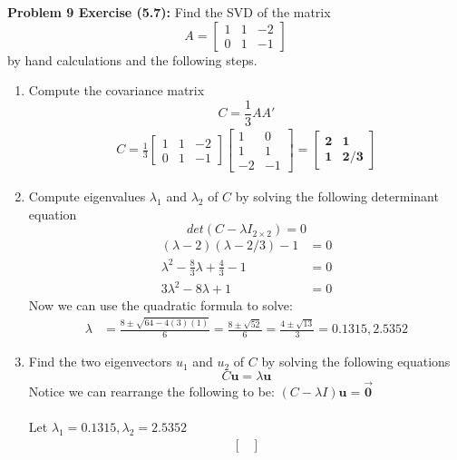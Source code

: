 \documentclass[11pt]{article}
\newenvironment{problem}[1]{\textbf{Problem #1: }}{\newpage}
\begin{document}
	\begin{problem}{9 Exercise (5.7)}
		Find the SVD of the matrix
		\[A = \begin{bmatrix}
			1 & 1 & -2 \\
			0 & 1 & -1
		\end{bmatrix}\]
		by hand calculations and the following steps.
		\begin{enumerate}[label = (\alph*)]
			\item Compute the covariance matrix
			\[C = \frac{1}{3}AA'\]
			\begin{align*}
				C = \frac{1}{3}\begin{bmatrix}
					1 & 1 & -2 \\
					0 & 1 & -1
				\end{bmatrix}\begin{bmatrix}
					1 & 0 \\
					1 & 1 \\
					-2 & -1 
				\end{bmatrix} = \boldsymbol{\begin{bmatrix}
					2 & 1 \\
					1 & 2/3	
				\end{bmatrix}}
			\end{align*}
			\item Compute eigenvalues $\lambda_1$ and $\lambda_2$ of $C$ by solving the following determinant equation
			\[det(C - \lambda I_{2 \times 2}) = 0\] 
			\begin{align*}
				(\lambda - 2)(\lambda - 2/3 ) - 1 &= 0 \\
				\lambda^2 - \frac{8}{3}\lambda + \frac{4}{3} - 1 &= 0 \\
				3\lambda^2 - 8\lambda + 1 &= 0
			\end{align*}
			Now we can use the quadratic formula to solve:
			\begin{align*}
				\lambda &= \frac{8 \pm \sqrt{64 - 4(3)(1)}}{6} = \frac{8 \pm \sqrt{52}}{6} = \frac{4 \pm \sqrt{13}}{3} = \boldsymbol{0.1315, 2.5352}
			\end{align*}
			\item Find the two eigenvectors $u_1$ and $u_2$ of $C$ by solving the following equations
			\[C\boldsymbol{u} = \lambda\boldsymbol{u}\]
			Notice we can rearrange the following to be:
			$(C - \lambda I)\boldsymbol{u} = \boldsymbol{\vec{0}}$
			\\ \\
			Let $\lambda_1 = 0.1315, \lambda_2 = 2.5352$
			\begin{align*}
				\begin{bmatrix}

\end{bmatrix}
\end{align*}
\end{enumerate}
\end{problem}
\end{document}
